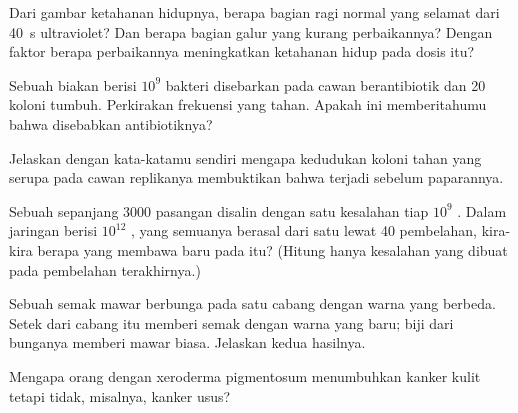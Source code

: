 \begin{exercise}[$\star\star$]\label{exo:g11:mutations:6}
Dari gambar ketahanan hidupnya, berapa bagian ragi normal yang selamat
dari \qty{40}{s} ultraviolet? Dan berapa bagian galur yang kurang
perbaikannya? Dengan faktor berapa perbaikannya meningkatkan
ketahanan hidup pada dosis itu?
\end{exercise}

\begin{exercise}[$\star\star$]\label{exo:g11:mutations:7}
Sebuah biakan berisi $10^9$ bakteri disebarkan pada cawan berantibiotik
dan 20 koloni tumbuh. Perkirakan frekuensi  yang tahan. Apakah ini
memberitahumu bahwa  disebabkan antibiotiknya?
\end{exercise}

\begin{exercise}[$\star\star$]\label{exo:g11:mutations:8}
Jelaskan dengan kata-katamu sendiri mengapa kedudukan koloni tahan yang
serupa pada cawan replikanya membuktikan bahwa  terjadi
sebelum paparannya.
\end{exercise}

\begin{exercise}[$\star\star$]\label{exo:g11:mutations:9}
Sebuah  sepanjang \num{3000} pasangan  disalin dengan satu
kesalahan tiap $10^9$ . Dalam jaringan berisi $10^{12}$ ,
yang semuanya berasal dari satu  lewat 40 pembelahan, kira-kira
berapa  yang membawa  baru pada  itu? (Hitung hanya
kesalahan yang dibuat pada pembelahan terakhirnya.)
\end{exercise}

\begin{exercise}[$\star\star$]\label{exo:g11:mutations:10}
Sebuah semak mawar berbunga pada satu cabang dengan warna yang berbeda.
Setek dari cabang itu memberi semak dengan warna yang baru; biji dari
bunganya memberi mawar biasa. Jelaskan kedua hasilnya.
\end{exercise}

\begin{exercise}[$\star\star$]\label{exo:g11:mutations:11}
Mengapa orang dengan xeroderma pigmentosum menumbuhkan kanker kulit
tetapi tidak, misalnya, kanker usus?
\end{exercise}

